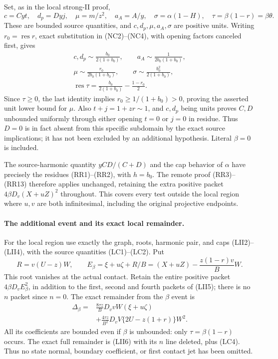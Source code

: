 Set, as in the local strong-II proof,
\[
 c=Cyt,\quad d_p=Dyj,\quad
 \mu=m/z^2,\quad a_A=A/y,\quad
 \sigma=\alpha(1-H),\quad \tau=\beta(1-r)=\beta\theta.
\]
These are bounded source quantities, and $c,d_p,\mu,a_A,\sigma$
are positive units.  Writing $r_0=\operatorname{res}r$, exact
substitution in (NC2)--(NC4), with opening factors canceled first,
gives
\[
\begin{gathered}
 c,d_p\sim\frac{b_0}{2(1+b_0)},\qquad
 a_A\sim\frac1{2b_0(1+b_0)},\\
 \mu\sim\frac{r_0}{2b_0(1+b_0)},\qquad
 \sigma\sim\frac{b_0^2}{2(1+b_0)},\\
 \operatorname{res}\tau=
 \frac{b_0}{2(1+b_0)}-\frac{1-r_0}{2}.                    
\end{gathered}
\tag{LC2}
\]
Since $\tau\ge0$, the last identity implies
$r_0\ge1/(1+b_0)>0$, proving the asserted unit lower bound for
$\mu$.  Also $t+j=1+zr\sim1$, and $c,d_p$ being units proves
$C,D$ unbounded uniformly through either opening $t=0$ or $j=0$
in residue.  Thus $D=0$ is in fact absent from this specific
subdomain by the exact source implications; it has not been excluded
by an additional hypothesis.  Literal $\beta=0$ is included.

The source-harmonic quantity $yCD/(C+D)$ and the cap behavior of
$\alpha$ have precisely the residues (RR1)--(RR2), with
$h=b_0$.  The remote proof (RR3)--(RR13) therefore applies unchanged,
retaining the extra positive packet
$4\beta D_v(X+uZ)^2$ throughout.  This covers every test outside
the local region where $u,v$ are both infinitesimal, including the
original projective endpoints.

\paragraph{The additional event and its exact local remainder.}
For the local region use exactly the graph, roots, harmonic pair,
and caps (LII2)--(LII4), with the source quantities (LC1)--(LC2).
Put
\[
 R=v(U-z)W,\qquad
 E_\beta=\xi+u\zeta+R/B
          =(X+uZ)-\frac{z(1-r)v}{B}W.                    \tag{LC3}
\]
This root vanishes at the actual contact.  Retain the entire
positive packet $4\beta D_vE_\beta^2$, in addition to the first,
second and fourth packets of (LII5); there is no $n$ packet since
$n=0$.  The exact remainder from the $\beta$ event is
\[
 \begin{split}
 \Delta_\beta={}&
 \frac{8\tau z}{B}D_vvW(\xi+u\zeta)\\
 &+\frac{4\tau z}{B^2}D_vV\{2U-z(1+r)\}W^2.
 \end{split}                                             \tag{LC4}
\]
All its coefficients are bounded even if $\beta$ is unbounded:
only $\tau=\beta(1-r)$ occurs.  The exact full remainder is (LII6)
with its $n$ line deleted, plus (LC4).  Thus no state normal,
boundary coefficient, or first contact jet has been omitted.

